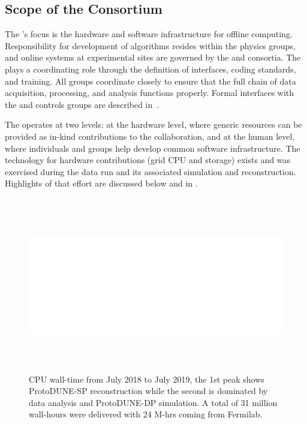 \subsection{Scope of the Consortium}
The 's focus is the hardware and software infrastructure  for offline computing.  Responsibility for development of algorithms  resides within the physics groups, %
and online systems at experimental sites are governed by the  and  consortia. The  plays a coordinating role through the definition of interfaces, coding standards, and training. All groups coordinate closely to ensure that the full chain of data acquisition, processing, and analysis %
functions properly. Formal interfaces with the  and controls groups are described in~\cite{bib:docdb7123,bib:docdb7126}. %

The  operates at two levels: at the hardware level, where generic resources can be provided as in-kind contributions to the collaboration, and at the human level, where individuals and groups help develop common software infrastructure.  The   technology for hardware contributions (grid CPU and storage) exists and was exercised during the  data run and its associated %
simulation and reconstruction. Highlights of that effort are discussed below and in \physchtools{}. %



\begin{figure}[htp]
\centering
\includegraphics[height=3in]{graphics/comp-ComputingLastYear.png}
\caption[CPU wall-time from July 2018 to July 2019]{CPU wall-time from July 2018 to July 2019, the 1st peak shows  ProtoDUNE-SP reconstruction while the second is dominated by data analysis and ProtoDUNE-DP simulation. A total of 31 million wall-hours were delivered with 24 M-hrs coming from Fermilab.  }
\label{fig:ch-exec-comp-cpupie}
\end{figure}


